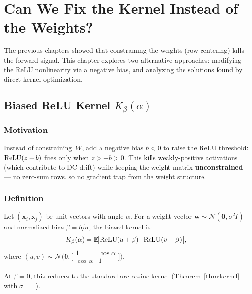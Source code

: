 \chapter{Can We Fix the Kernel Instead of the Weights?}
\label{ch:kernel}

The previous chapters showed that constraining the weights (row
centering) kills the forward signal.  This chapter explores two
alternative approaches: modifying the ReLU nonlinearity via a negative
bias, and analyzing the solutions found by direct kernel optimization.

\section{Biased ReLU Kernel $K_\beta(\alpha)$}
\label{sec:biased_relu}

\subsection{Motivation}

Instead of constraining~$W$, add a negative bias $b < 0$ to raise
the ReLU threshold: $\operatorname{ReLU}(z + b)$ fires only when $z > -b > 0$.
This kills weakly-positive activations (which contribute to DC drift)
while keeping the weight matrix \textbf{unconstrained} --- no
zero-sum rows, so no gradient trap from the weight structure.

\subsection{Definition}

Let $(\bm{x}_i, \bm{x}_j)$ be unit vectors with angle $\alpha$.
For a weight vector $\bm{w} \sim \mathcal{N}(\bm{0}, \sigma^2 I)$
and normalized bias $\beta = b/\sigma$, the biased kernel is:
\begin{equation}\label{eq:biased_kernel}
  K_\beta(\alpha)
  = \mathbb{E}\!\bigl[\operatorname{ReLU}(u + \beta) \cdot \operatorname{ReLU}(v + \beta)\bigr],
\end{equation}
where $(u,v) \sim \mathcal{N}\!\bigl(\bm{0},
\bigl[\begin{smallmatrix} 1 & \cos\alpha \\
\cos\alpha & 1\end{smallmatrix}\bigr]\bigr)$.

At $\beta = 0$, this reduces to the standard arc-cosine kernel
(Theorem~\ref{thm:kernel} with $\sigma = 1$).

